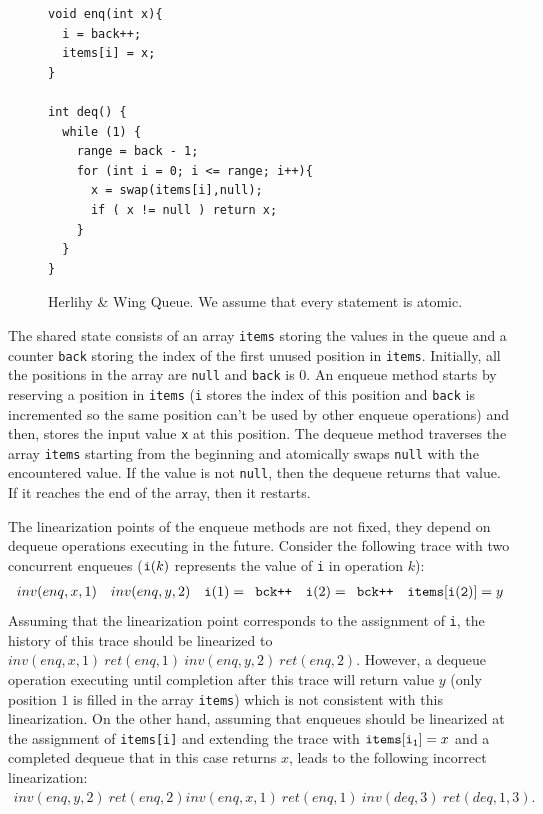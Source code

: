 \begin{figure}
\vspace{-8mm}
\begin{lstlisting}
void enq(int x){
  i = back++;
  items[i] = x;
}

int deq() {
  while (1) {
    range = back - 1;
    for (int i = 0; i <= range; i++){
      x = swap(items[i],null);
      if ( x != null ) return x;
    }
  }
}
  \end{lstlisting}
\vspace{-5mm}
\caption{Herlihy \& Wing Queue. We assume that every statement is atomic.}
\label{fig:HerlihyWing}
\vspace{-6mm}
\end{figure}
The shared state consists of an array {\tt items} storing the values in the queue and a counter {\tt back} storing the index of the first unused position in {\tt items}. Initially, all the positions in the array are {\tt null} and {\tt back} is 0.
An enqueue method starts by reserving a position in {\tt items} ({\tt i} stores the index of this position and {\tt back} is incremented so the same position can't be used by other enqueue operations) and then, stores the input value {\tt x} at this position. The dequeue method traverses the array {\tt items} starting from the beginning and atomically swaps {\tt null} with the encountered value. If the value is not {\tt null}, then the dequeue returns that value. If it reaches the end of the array, then it restarts.

The linearization points of the enqueue methods are not fixed, they depend on dequeue operations executing in the future. Consider the following trace with two concurrent enqueues (${\tt i}(k)$ represents the value of {\tt i} in operation $k$):
\begin{align*}
inv(enq,x,1)\ \ \ inv(enq,y,2)\ \ \ {\tt i}(1) = \mbox{{\tt bck++}}\ \ \ {\tt i}(2) = \mbox{{\tt bck++}}\ \ \ {\tt items[i(2)]} = y
\end{align*}
Assuming that the linearization point corresponds to the assignment of {\tt i}, the history of this trace should be linearized to $inv(enq,x,1)\ ret(enq,1)\ inv(enq,y,2)\ ret(enq,2)$. However, a dequeue operation executing until completion after this trace will return value $y$ (only position $1$ is filled in the array {\tt items}) which is not consistent with this linearization. On the other hand, assuming that enqueues should be linearized at the assignment of {\tt items[i]} and extending the trace with ${\tt items[i_1]} = x$ and a completed dequeue that in this case returns $x$, leads to the following incorrect linearization:
\begin{align*}
inv(enq,y,2)\ ret(enq,2) inv(enq,x,1)\ ret(enq,1)\ inv(deq,3)\ ret(deq,1,3).
\end{align*}

